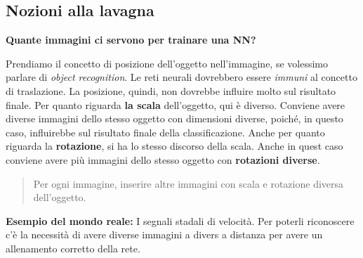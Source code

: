 \subsection{Nozioni alla lavagna}
\textbf{Quante immagini ci servono per trainare una NN?}

Prendiamo il concetto di posizione dell'oggetto nell'immagine, se volessimo
parlare di \textit{object recognition}. Le reti neurali dovrebbero essere
\textit{immuni} al concetto di traslazione. La posizione, quindi, non dovrebbe
influire molto sul risultato finale. Per quanto riguarda \textbf{la scala}
dell'oggetto, qui è diverso. Conviene avere diverse immagini dello stesso
oggetto con dimensioni diverse, poiché, in questo caso, influirebbe sul
risultato finale della classificazione. Anche per quanto riguarda la
\textbf{rotazione}, si ha lo stesso discorso della scala. Anche in quest caso
conviene avere più immagini dello stesso oggetto con \textbf{rotazioni
    diverse}.

\begin{quote}
    Per ogni immagine, inserire altre immagini con scala e rotazione diversa dell'oggetto.
\end{quote}

\textbf{Esempio del mondo reale:} I segnali stadali di velocità. 
Per poterli riconoscere c'è la necessità di avere diverse immagini 
a divers a distanza per avere un allenamento corretto della rete.

\newpage